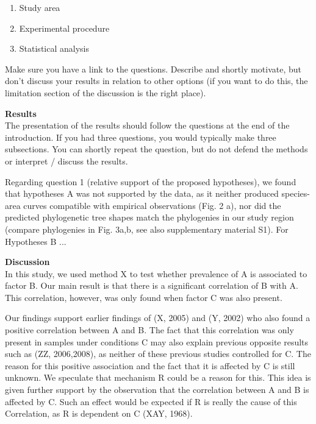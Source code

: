 \documentclass{tufte-book}
\begin{document}
\begin{enumerate}
\item Study area
\item Experimental procedure
\item Statistical analysis
\end{enumerate}

Make sure you have a link to the questions. Describe and shortly motivate, but don't discuss your results in relation to other options (if you want to do this, the limitation section of the discussion is the right place).

\noindent\textbf{Results}\\[0.3cm]

The presentation of the results should follow the questions at the end of the introduction. If you had three questions, you would typically make three subsections. You can shortly repeat the question, but do not defend the methods or interpret / discuss the results.

Regarding question 1 (relative support of the proposed hypotheses), we found that hypotheses A was not supported by the data, as it neither produced species-area curves compatible with empirical observations (Fig. 2 a), nor did the predicted phylogenetic tree shapes match the phylogenies in our study region (compare phylogenies in Fig. 3a,b, see also supplementary material S1). For Hypotheses B ...

\noindent\textbf{Discussion}\\[0.3cm]

In this study, we used method X to test whether prevalence of A is associated to factor B. Our main result is that there is a significant correlation of B with A. This correlation, however, was only found when factor C was also present.

Our findings support earlier findings of (X, 2005) and (Y, 2002) who also found a positive correlation between A and B. The fact that this correlation was only present in samples under conditions C may also explain previous opposite results such as (ZZ, 2006,2008), as neither of these previous studies controlled for C. The reason for this positive association and the fact that it is affected by C is still unknown. We speculate that mechanism R could be a reason for this. This idea is given further support by the observation that the correlation between A and B is affected by C. Such an effect would be expected if R is really the cause of this Correlation, as R is dependent on C (XAY, 1968).
\end{document}
